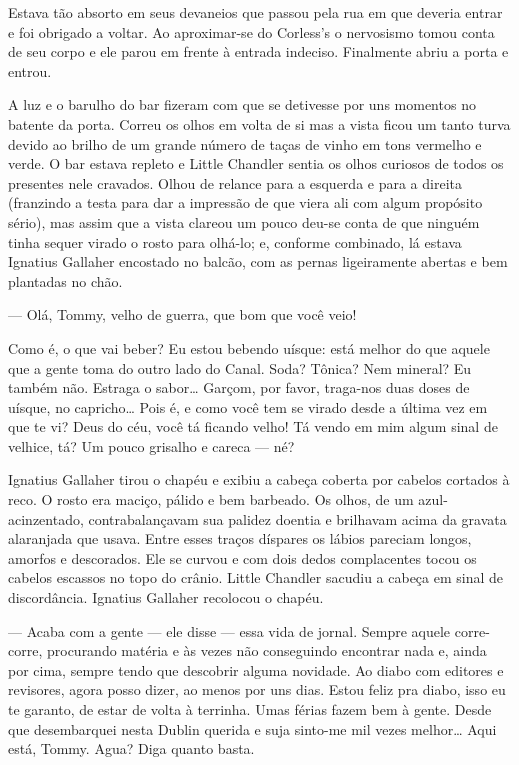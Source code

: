 Estava tão absorto em seus devaneios que passou pela rua em que
deveria entrar e foi obrigado a voltar. Ao aproximar-se do Corless's o
nervosismo tomou conta de seu corpo e ele parou em frente à entrada
indeciso. Finalmente abriu a porta e entrou.

A luz e o barulho do bar fizeram com que se detivesse por uns momentos
no batente da porta. Correu os olhos em volta
de si mas a vista ficou um tanto turva devido ao brilho de um
grande número de taças de vinho em tons vermelho e verde. O
bar estava repleto e Little Chandler sentia os olhos curiosos
de todos os presentes nele cravados. Olhou de relance para a
esquerda e para a direita (franzindo a testa para dar a impressão de
que viera ali com algum propósito sério), mas assim que a vista
clareou um pouco deu-se conta de que ninguém tinha sequer virado o
rosto para olhá-lo; e, conforme combinado, lá estava Ignatius Gallaher
encostado no balcão, com as pernas ligeiramente abertas e bem
plantadas no chão.

--- Olá, Tommy, velho de guerra, que bom que você veio!

Como é, o que vai beber? Eu estou bebendo uísque: está melhor
do que aquele que a gente toma do outro lado do Canal. Soda? Tônica?
Nem mineral? Eu também não. Estraga o sabor\ldots{} Garçom,
por favor, traga-nos duas doses de uísque, no capricho\ldots{} Pois é, e
como você tem se virado desde a última vez em que te vi? Deus do céu,
você tá ficando velho! Tá vendo em mim algum sinal de velhice, tá? Um
pouco grisalho e careca --- né?

Ignatius Gallaher tirou o chapéu e exibiu a cabeça coberta por cabelos
cortados à reco. O rosto era maciço, pálido e bem barbeado. Os
olhos, de um azul-acinzentado, contrabalançavam sua palidez doentia e
brilhavam acima da gravata alaranjada que usava. Entre esses traços
díspares os lábios pareciam longos, amorfos e descorados. Ele se
curvou e com dois dedos complacentes tocou os cabelos escassos no
topo do crânio. Little Chandler sacudiu a cabeça em sinal de
discordância. Ignatius Gallaher recolocou o chapéu.

--- Acaba com a gente --- ele disse --- essa vida de jornal. Sempre
aquele corre-corre, procurando matéria e às vezes não conseguindo
encontrar nada e, ainda por cima, sempre tendo que descobrir alguma
novidade. Ao diabo com editores e revisores, agora posso dizer, ao
menos por uns dias. Estou feliz pra diabo, isso eu te garanto, de
estar de volta à terrinha. Umas férias fazem bem à gente. Desde que
desembarquei nesta Dublin querida e suja sinto-me mil vezes
melhor\ldots{} Aqui está, Tommy. Agua? Diga quanto basta.

